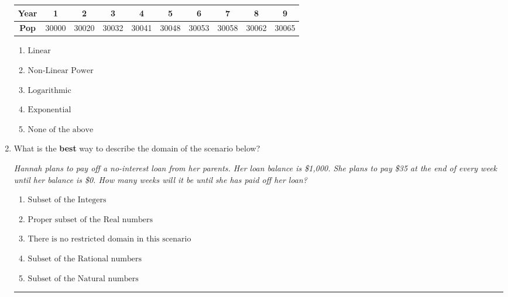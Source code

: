 \documentclass[14pt]{extbook}
\newcommand{\litem}[1]{\item#1\hspace*{-1cm}\rule{\textwidth}{0.4pt}}
\begin{document}
\begin{enumerate}
{\begin{tabular}{c|c|c|c|c|c|c|c|c|c}
\textbf{Year} &1 &2 &3 &4 &5 &6 &7 &8 &9\tabularnewline \hline
\textbf{Pop} &30000 &30020 &30032 &30041 &30048 &30053 &30058 &30062 &30065\end{tabular}\begin{enumerate}[label=\Alph*.]
\item \( \text{Linear} \)
\item \( \text{Non-Linear Power} \)
\item \( \text{Logarithmic} \)
\item \( \text{Exponential} \)
\item \( \text{None of the above} \)

\end{enumerate} }
\litem{
What is the \textbf{best} way to describe the domain of the scenario below?
\begin{center}
    \textit{ Hannah plans to pay off a no-interest loan from her parents. Her loan balance is \$1,000. She plans to pay \$35 at the end of every week until her balance is \$0. How many weeks will it be until she has paid off her loan? }
\end{center}
\begin{enumerate}[label=\Alph*.]
\item \( \text{Subset of the Integers} \)
\item \( \text{Proper subset of the Real numbers} \)
\item \( \text{There is no restricted domain in this scenario} \)
\item \( \text{Subset of the Rational numbers} \)
\item \( \text{Subset of the Natural numbers} \)

\end{enumerate} }
\end{enumerate}
\end{document}
